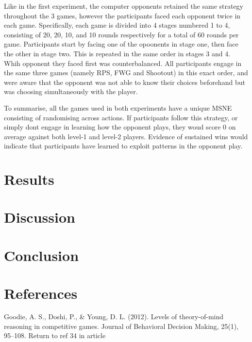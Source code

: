 \documentclass[12pt]{article}         %
\begin{document}
Like in the first experiment, the computer opponents retained the same strategy throughout the 3 games, however the participants faced each opponent twice in each game. Specifically, each game is divided into 4 stages numbered 1 to 4, consisting of 20, 20, 10, and 10 rounds respectively for a total of 60 rounds per game. Participants start by facing one of the opoonents in stage one, then face the other in stage two. This is repeated in the same order in stages 3 and 4. Whih opponent they faced first was counterbalanced. All participants engage in the same three games (namely RPS, FWG and Shootout) in this exact order, and were aware that the opponent was not able to know their choices beforehand but was choosing simultaneously with the player. 

To summarise, all the games used in both experiments have a unique MSNE consisting of randomising across actions. If participants follow this strategy, or simply dont engage in learning how the opponent plays, they woud score 0 on average against both level-1 and level-2 players. Evidence of sustained wins would indicate that participants have learned to exploit patterns in the opponent play. 



\section*{Results}



\section*{Discussion}



\section*{Conclusion}

  
\section{References}
Goodie, A. S., Doshi, P., & Young, D. L. (2012). Levels of theory-of-mind reasoning in competitive games. Journal of Behavioral Decision Making, 25(1), 95–108.
Return to ref 34 in article
\end{document}
